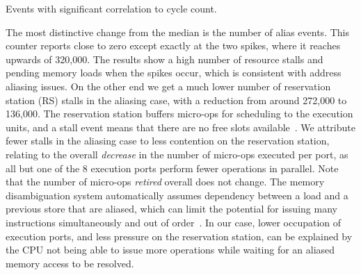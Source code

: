 \documentclass[10pt, conference, compsocconf]{IEEEtran}
\newcommand{\perfctr}[1] {
  {\lowercase{#1}}
}
\begin{document}
\begin{table}
  \caption{Events with significant correlation to cycle count.\label{tab:loopcorrelation}}
  \pgfplotstabletypeset[
    int detect, %
    col sep=comma,
    columns={Performance counter, Median, [index]3}, %
    column type=r,
    columns/Performance counter/.style={
      string type, 
      column type=l,
      column type/.add={|}{},
      postproc cell content/.append code={
        \pgfkeysalso{@cell content=\perfctr{##1}}
      }
    },
    every head row/.style={
      output empty row,
      before row={\hline
        Performance counter & Median & Spike \\ %
      },
      after row=\hline\hline
    },
    every last row/.style={after row=\hline},
    every last column/.style={column type/.add={}{|}}
  ]{bin/microkernel-comparison-haswell.csv}
\end{table}

The most distinctive change from the median is the number of alias events.
This counter reports close to zero except exactly at the two spikes, where it reaches upwards of 320,000.
The results show a high number of resource stalls and pending memory loads when the spikes occur, which is consistent with address aliasing issues.
On the other end we get a much lower number of reservation station (RS) stalls in the aliasing case, with a reduction from around 272,000 to 136,000.
The reservation station buffers micro-ops for scheduling to the execution units, and a stall event means that there are no free slots available~\cite[Table 19-2]{Volume3B}.
We attribute fewer stalls in the aliasing case to less contention on the reservation station, 
relating to the overall \emph{decrease} in the number of micro-ops executed per port, as all but one of the 8 execution ports perform fewer operations in parallel.
Note that the number of micro-ops \emph{retired} overall does not change.
The memory disambiguation system automatically assumes dependency between a load and a previous store that are aliased, which can limit the potential for issuing many instructions simultaneously and out of order~\cite[Page 2-20]{OptimizationManual}.
In our case, lower occupation of execution ports, and less pressure on the reservation station, can be explained by the CPU not being able to issue more operations while waiting for an aliased memory access to be resolved.
\end{document}
